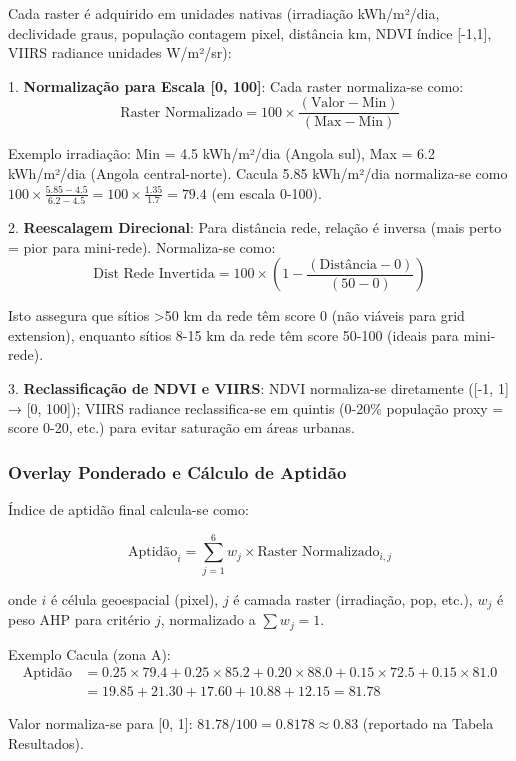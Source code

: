 \documentclass[12pt, a4paper]{article}
\begin{document}
Cada raster é adquirido em unidades nativas (irradiação kWh/m²/dia, declividade graus, população contagem pixel, distância km, NDVI índice [-1,1], VIIRS radiance unidades W/m²/sr):

1. \textbf{Normalização para Escala [0, 100]}: Cada raster normaliza-se como:
$$
\text{Raster Normalizado} = 100 \times \frac{(\text{Valor} - \text{Min})}{(\text{Max} - \text{Min})}
$$

Exemplo irradiação: Min = 4.5 kWh/m²/dia (Angola sul), Max = 6.2 kWh/m²/dia (Angola central-norte). Cacula 5.85 kWh/m²/dia normaliza-se como $100 \times \frac{5.85-4.5}{6.2-4.5} = 100 \times \frac{1.35}{1.7} = 79.4$ (em escala 0-100).

2. \textbf{Reescalagem Direcional}: Para distância rede, relação é inversa (mais perto = pior para mini-rede). Normaliza-se como:
$$
\text{Dist Rede Invertida} = 100 \times \left(1 - \frac{(\text{Distância} - 0)}{(50 - 0)}\right)
$$

Isto assegura que sítios >50 km da rede têm score 0 (não viáveis para grid extension), enquanto sítios 8-15 km da rede têm score 50-100 (ideais para mini-rede).

3. \textbf{Reclassificação de NDVI e VIIRS}: NDVI normaliza-se diretamente ([-1, 1] → [0, 100]); VIIRS radiance reclassifica-se em quintis (0-20\% população proxy = score 0-20, etc.) para evitar saturação em áreas urbanas.

\subsubsection{Overlay Ponderado e Cálculo de Aptidão}

Índice de aptidão final calcula-se como:

$$
\text{Aptidão}_i = \sum_{j=1}^{6} w_j \times \text{Raster Normalizado}_{i,j}
$$

onde $i$ é célula geoespacial (pixel), $j$ é camada raster (irradiação, pop, etc.), $w_j$ é peso AHP para critério $j$, normalizado a $\sum w_j = 1$.

Exemplo Cacula (zona A):
\begin{align}
\text{Aptidão} &= 0.25 \times 79.4 + 0.25 \times 85.2 + 0.20 \times 88.0 + 0.15 \times 72.5 + 0.15 \times 81.0 \\
&= 19.85 + 21.30 + 17.60 + 10.88 + 12.15 = 81.78
\end{align}

Valor normaliza-se para [0, 1]: $81.78 / 100 = 0.8178 \approx 0.83$ (reportado na Tabela Resultados).
\end{document}
